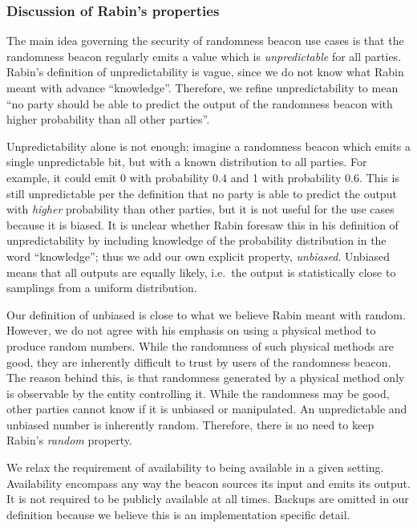 \subsubsection{Discussion of Rabin's properties}
The main idea governing the security of randomness beacon use cases is that the randomness beacon regularly emits a value which is \emph{unpredictable} for all parties.
Rabin's definition of unpredictability is vague, since we do not know what Rabin meant with advance \enquote{knowledge}.
Therefore, we refine unpredictability to mean \enquote{no party should be able to predict the output of the randomness beacon with higher probability than all other parties}.

Unpredictability alone is not enough; imagine a randomness beacon which emits a single unpredictable bit, but with a known distribution to all parties.
For example, it could emit 0 with probability $0.4$ and 1 with probability $0.6$.
This is still unpredictable per the definition that no party is able to predict the output with \emph{higher} probability than other parties, but it is not useful for the use cases because it is biased.
It is unclear whether Rabin foresaw this in his definition of unpredictability by including knowledge of the probability distribution in the word \enquote{knowledge}; thus we add our own explicit property, \emph{unbiased}.
Unbiased means that all outputs are equally likely, i.e.\ the output is statistically close to samplings from a uniform distribution.

Our definition of unbiased is close to what we believe Rabin meant with random.
However, we do not agree with his emphasis on using a physical method to produce random numbers.
While the randomness of such physical methods are good, they are inherently difficult to trust by users of the randomness beacon.
The reason behind this, is that randomness generated by a physical method only is observable by the entity controlling it.
While the randomness may be good, other parties cannot know if it is unbiased or manipulated.
An unpredictable and unbiased number is inherently random. Therefore, there is no need to keep Rabin's \emph{random} property.

We relax the requirement of availability to being available in a given setting.
Availability encompass any way the beacon sources its input and emits its output.
It is not required to be publicly available at all times.
Backups are omitted in our definition because we believe this is an implementation specific detail.

